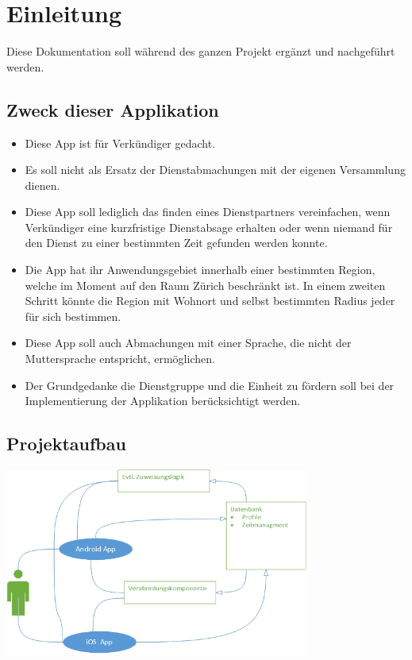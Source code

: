 \section{Einleitung}

Diese Dokumentation soll während des ganzen Projekt ergänzt und nachgeführt werden.
\subsection{Zweck dieser Applikation}
\begin{itemize}
\item Diese App ist für Verkündiger gedacht.
\item Es soll nicht als Ersatz der Dienstabmachungen mit der eigenen Versammlung dienen.
\item Diese App soll lediglich das finden eines Dienstpartners vereinfachen, wenn Verkündiger eine kurzfristige Dienstabsage erhalten oder wenn niemand für den Dienst zu einer bestimmten Zeit gefunden werden konnte.
\item Die App hat ihr Anwendungsgebiet innerhalb einer bestimmten Region, welche im Moment auf den Raum Zürich beschränkt ist. In einem zweiten Schritt könnte die Region mit Wohnort und selbst bestimmten Radius jeder für sich bestimmen.
\item Diese App soll auch Abmachungen mit einer Sprache, die nicht der Muttersprache entspricht, ermöglichen.
\item Der Grundgedanke die Dienstgruppe und die Einheit zu fördern soll bei der Implementierung der Applikation berücksichtigt werden.
\end{itemize}

\subsection{Projektaufbau}

\begin{center}
\includegraphics[width=0.75\textwidth]{bilder/useCase.png}
\end{center}
